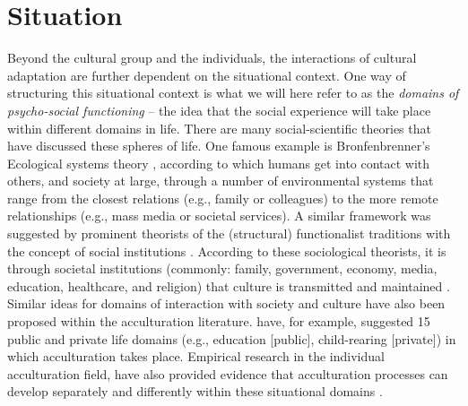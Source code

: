 \documentclass[man, 12pt, a4paper]{apa7}
\begin{document}
\section{Situation} 
Beyond the cultural group and the individuals, the interactions of cultural adaptation are further dependent on the situational context. One way of structuring this situational context is what we will here refer to as the \textit{domains of psycho-social functioning} -- the idea that the social experience will take place within different domains in life. There are many social-scientific theories that have discussed these spheres of life. One famous example is Bronfenbrenner's Ecological systems theory \citep{Bronfenbrenner1992}, according to which humans get into contact with others, and society at large, through a number of environmental systems that range from the closest relations (e.g., family or colleagues) to the more remote relationships (e.g., mass media or societal services). A similar framework was suggested by prominent theorists of the (structural) functionalist traditions with the concept of social institutions \citep[e.g.,][]{Turner1997}. According to these sociological theorists, it is through societal institutions (commonly: family, government, economy, media, education, healthcare, and religion) that culture is transmitted and maintained \citep[e.g.,][]{Durkheim1982}. Similar ideas for domains of interaction with society and culture have also been proposed within the acculturation literature. \citet{Arends-Toth2006, Arends-Toth2007} have, for example, suggested 15 public and private life domains (e.g., education [public], child-rearing [private]) in which acculturation takes place. Empirical research in the individual acculturation field, have also provided evidence that acculturation processes can develop separately and differently within these situational domains \citep[e.g.,][]{Arends-Toth2003a}. 
\end{document}

